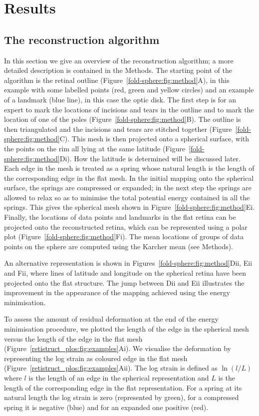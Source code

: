 \documentclass[10pt]{article}
\begin{document}
\section*{Results}

\subsection*{The reconstruction algorithm}

In this section we give an overview of the reconstruction algorithm; a
more detailed description is contained in the Methods. The starting
point of the algorithm is the retinal outline
(Figure~\ref{fold-sphere:fig:method}A), in this example with some
labelled points (red, green and yellow circles) and an example of a
landmark (blue line), in this case the optic disk.  The first step is
for an expert to mark the locations of incisions and tears in the
outline and to mark the location of one of the poles
(Figure~\ref{fold-sphere:fig:method}B). The outline is then
triangulated and the incisions and tears are stitched together
(Figure~\ref{fold-sphere:fig:method}C). This mesh is then projected
onto a spherical surface, with the points on the rim all lying at the
same latitude (Figure~\ref{fold-sphere:fig:method}Di). How the
latitude is determined will be discussed later. Each edge in the mesh
is treated as a spring whose natural length is the length of the
corresponding edge in the flat mesh.  In the initial mapping onto the
spherical surface, the springs are compressed or expanded; in the next
step the springs are allowed to relax so as to minimise the total
potential energy contained in all the springs. This gives the
spherical mesh shown in
Figure~\ref{fold-sphere:fig:method}Ei. Finally, the locations of data
points and landmarks in the flat retina can be projected onto the
reconstructed retina, which can be represented using a polar plot
(Figure~\ref{fold-sphere:fig:method}Fi). The mean locations of groups
of data points on the sphere are computed using the Karcher mean (see
Methods).

An alternative representation is shown in
Figures~\ref{fold-sphere:fig:method}Dii, Eii and Fii, where lines of
latitude and longitude on the spherical retina have been projected
onto the flat structure. The jump between Dii and Eii illustrates the
improvement in the appearance of the mapping achieved using the energy
minimisation.

To assess the amount of residual deformation at the end of the energy
minimisation procedure, we plotted the length of the edge in the
spherical mesh versus the length of the edge in the flat mesh
(Figure~\ref{retistruct_plos:fig:examples}Ai). We visualise the
deformation by representing the log strain as coloured edge in the
flat mesh (Figure~\ref{retistruct_plos:fig:examples}Aii). The log
strain is defined as $\ln(l/L)$ where $l$ is the length of an edge in
the spherical representation and $L$ is the length of the
corresponding edge in the flat representation. For a spring at its
natural length the log strain is zero (represented by green), for a
compressed spring it is negative (blue) and for an expanded one
positive (red).
\end{document}
